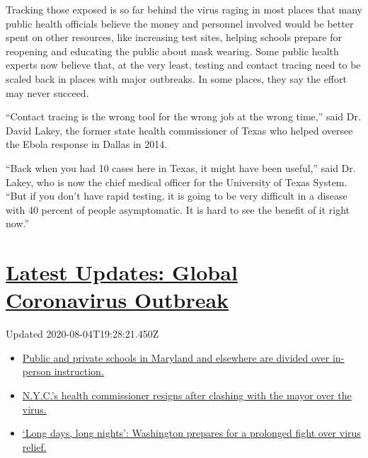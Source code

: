 Tracking those exposed is so far behind the virus raging in most places
that many public health officials believe the money and personnel
involved would be better spent on other resources, like increasing test
sites, helping schools prepare for reopening and educating the public
about mask wearing. Some public health experts now believe that, at the
very least, testing and contact tracing need to be scaled back in places
with major outbreaks. In some places, they say the effort may never
succeed.

``Contact tracing is the wrong tool for the wrong job at the wrong
time,'' said Dr. David Lakey, the former state health commissioner of
Texas who helped oversee the Ebola response in Dallas in 2014.

``Back when you had 10 cases here in Texas, it might have been useful,''
said Dr. Lakey, who is now the chief medical officer for the University
of Texas System. ``But if you don't have rapid testing, it is going to
be very difficult in a disease with 40 percent of people asymptomatic.
It is hard to see the benefit of it right now.''

\hypertarget{latest-updates-global-coronavirus-outbreak}{%
\section{\texorpdfstring{\href{https://www.nytimes.com/2020/08/04/world/coronavirus-cases.html?action=click\&pgtype=Article\&state=default\&region=MAIN_CONTENT_1\&context=storylines_live_updates}{Latest
Updates: Global Coronavirus
Outbreak}}{Latest Updates: Global Coronavirus Outbreak}}\label{latest-updates-global-coronavirus-outbreak}}

Updated 2020-08-04T19:28:21.450Z

\begin{itemize}
\tightlist
\item
  \href{https://www.nytimes.com/2020/08/04/world/coronavirus-cases.html?action=click\&pgtype=Article\&state=default\&region=MAIN_CONTENT_1\&context=storylines_live_updates\#link-4825b93}{Public
  and private schools in Maryland and elsewhere are divided over
  in-person instruction.}
\item
  \href{https://www.nytimes.com/2020/08/04/world/coronavirus-cases.html?action=click\&pgtype=Article\&state=default\&region=MAIN_CONTENT_1\&context=storylines_live_updates\#link-4d1eafa8}{N.Y.C.'s
  health commissioner resigns after clashing with the mayor over the
  virus.}
\item
  \href{https://www.nytimes.com/2020/08/04/world/coronavirus-cases.html?action=click\&pgtype=Article\&state=default\&region=MAIN_CONTENT_1\&context=storylines_live_updates\#link-6b644638}{`Long
  days, long nights': Washington prepares for a prolonged fight over
  virus relief.}
\end{itemize}

